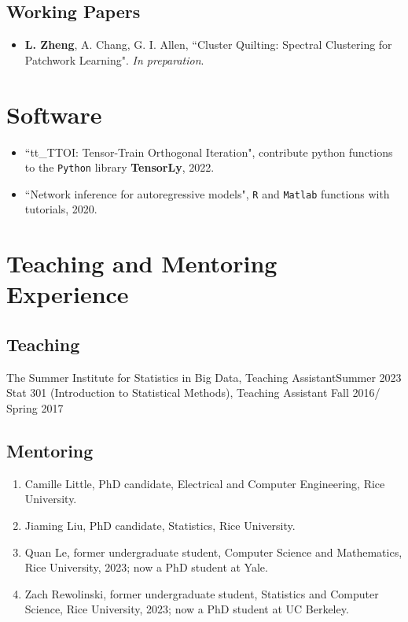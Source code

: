 \documentclass[letterpaper,11pt]{article}
\begin{document}
	\subsection*{Working Papers}
	\begin{itemize}
		\item {\bf L. Zheng}, A. Chang, G. I. Allen, ``Cluster Quilting: Spectral Clustering for Patchwork Learning". {\em In preparation}.
	\end{itemize}
	\section{Software}
	\begin{itemize}
		\item ``tt\_TTOI: Tensor-Train Orthogonal Iteration", contribute python functions to the \verb|Python| library {\bf TensorLy}, 2022.
		\item ``Network inference for autoregressive models", \verb|R| and \verb|Matlab| functions with tutorials, 2020.
	\end{itemize}
	\section{Teaching and Mentoring Experience}
	\subsection*{Teaching}
	The Summer Institute for Statistics in Big Data, Teaching Assistant\hfill Summer 2023\\
	Stat 301 (Introduction to Statistical Methods), Teaching Assistant \hfill Fall 2016/ Spring 2017
	\subsection*{Mentoring}
	\begin{enumerate}
		\item Camille Little, PhD candidate, Electrical and Computer Engineering, Rice University.
		\item Jiaming Liu, PhD candidate, Statistics, Rice University.
		\item Quan Le, former undergraduate student, Computer Science and Mathematics, Rice University, 2023; now a PhD student at Yale.
		\item Zach Rewolinski, former undergraduate student, Statistics and Computer Science, Rice University, 2023; now a PhD student at UC Berkeley.
	\end{enumerate}
\end{document}
